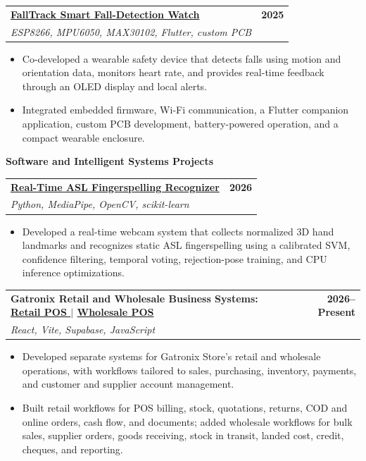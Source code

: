 \documentclass[a4paper,10pt]{article}
\makeatletter
\newcommand{\projectEntry}[3]{%
  \Needspace{9\baselineskip}%
  \begin{tabularx}{\textwidth}{@{}Xr@{}}
    \textbf{#1} & \textbf{\small #3} \\
    {\small\textit{#2}} &
  \end{tabularx}
  \vspace{0.35mm}
}
\newcommand{\projectCategory}[1]{%
  \vspace{1.0mm}
  {\normalsize\bfseries\color{accent} #1}\par
  \vspace{0.75mm}
}
\makeatother
\begin{document}
\projectEntry
  {\href{https://github.com/hakammra/falltrack-watch}{FallTrack Smart Fall-Detection Watch \faGithub}}
  {ESP8266, MPU6050, MAX30102, Flutter, custom PCB}
  {2025}
\begin{itemize}
  \item Co-developed a wearable safety device that detects falls using motion and orientation data, monitors heart rate, and provides real-time feedback through an OLED display and local alerts.
  \item Integrated embedded firmware, Wi-Fi communication, a Flutter companion application, custom PCB development, battery-powered operation, and a compact wearable enclosure.
\end{itemize}
\vspace{1.5mm}

\projectCategory{Software and Intelligent Systems Projects}

\projectEntry
  {\href{https://github.com/hakammra/asl-fingerspelling-webcam}{Real-Time ASL Fingerspelling Recognizer \faGithub}}
  {Python, MediaPipe, OpenCV, scikit-learn}
  {2026}
\begin{itemize}
  \item Developed a real-time webcam system that collects normalized 3D hand landmarks and recognizes static ASL fingerspelling using a calibrated SVM, confidence filtering, temporal voting, rejection-pose training, and CPU inference optimizations.
\end{itemize}
\vspace{1.35mm}

\projectEntry
  {Gatronix Retail and Wholesale Business Systems:
  \href{https://github.com/hakammra/Shop-POS}{Retail POS \faGithub}
  \enspace $\vert$ \enspace
  \href{https://github.com/hakammra/gs-wholesale}{Wholesale POS \faGithub}}
  {React, Vite, Supabase, JavaScript}
  {2026--Present}
\begin{itemize}
  \item Developed separate systems for Gatronix Store's retail and wholesale operations, with workflows tailored to sales, purchasing, inventory, payments, and customer and supplier account management.
  \item Built retail workflows for POS billing, stock, quotations, returns, COD and online orders, cash flow, and documents; added wholesale workflows for bulk sales, supplier orders, goods receiving, stock in transit, landed cost, credit, cheques, and reporting.
\end{itemize}
\vspace{1.35mm}
\end{document}
